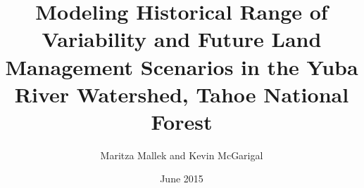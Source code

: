 \documentclass[12pt]{book}
\begin{document}
\author{Maritza Mallek and Kevin McGarigal}
\title{Modeling Historical Range of Variability and Future Land Management Scenarios in the Yuba River Watershed, Tahoe National Forest}
\date{June 2015}

%

\maketitle
\frontmatter 
\tableofcontents 
% 

\mainmatter 

 
 
 

 



\backmatter 
% 
% 
\end{document}
